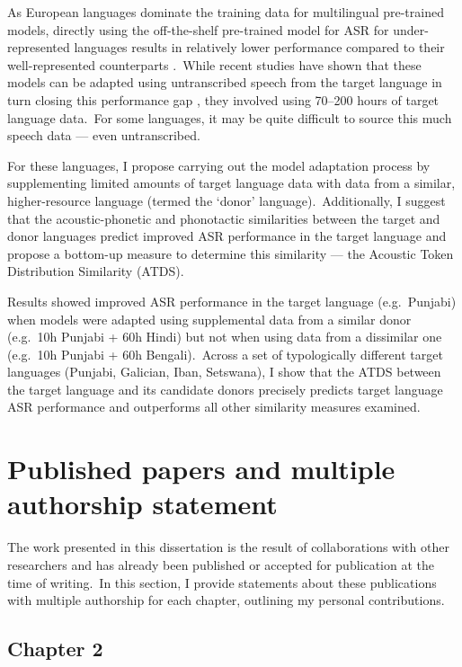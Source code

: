 \documentclass[main.tex]{subfiles}
\begin{document}
As European languages dominate the training data for multilingual pre-trained models, directly using the off-the-shelf pre-trained model for ASR for under-represented languages results in relatively lower performance compared to their well-represented counterparts \parencite{conneau2023fleurs}.~While recent studies have shown that these models can be adapted using untranscribed speech from the target language in turn closing this performance gap \parencite[e.g.][]{NOWAKOWSKI2023103148,paraskevopoulos2024sample}, they involved using 70–200 hours of target language data.~For some languages, it may be quite difficult to source this much speech data --- even untranscribed.

\newpage
For these languages, I propose carrying out the model adaptation process by supplementing limited amounts of target language data with data from a similar, higher-resource language (termed the `donor' language).~Additionally, I suggest that the acoustic-phonetic and phonotactic similarities between the target and donor languages predict improved ASR performance in the target language and propose a bottom-up measure to determine this similarity --- the Acoustic Token Distribution Similarity (ATDS).

Results showed improved ASR performance in the target language (e.g.~Punjabi) when models were adapted using supplemental data from a similar donor (e.g.~10h Punjabi + 60h Hindi) but not when using data from a dissimilar one (e.g.~10h Punjabi + 60h Bengali).~Across a set of typologically different target languages (Punjabi, Galician, Iban, Setswana), I show that the ATDS between the target language and its candidate donors precisely predicts target language ASR performance and outperforms all other similarity measures examined.

\section{Published papers and multiple authorship statement}
\label{sec:published}

The work presented in this dissertation is the result of collaborations with other researchers and has already been published or accepted for publication at the time of writing.~In this section, I provide statements about these publications with multiple authorship for each chapter, outlining my personal contributions.

\subsection{Chapter 2}
\end{document}
